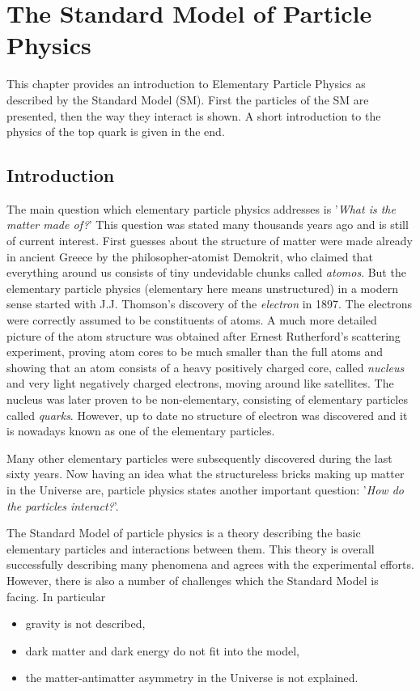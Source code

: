 \chapter{The Standard Model of Particle Physics}\label{chapt:SM}

This chapter provides an introduction to Elementary Particle Physics as described by the Standard Model (SM).
First the particles of the SM are presented, then the way they interact is shown. A short introduction
to the physics of the top quark is given in the end.

\section{Introduction}

The main question which elementary particle physics addresses is '\textit{What is the matter made of?}'
This question was stated many thousands years ago and is still of current interest. First guesses about
the structure of matter were made already in ancient Greece by the philosopher-atomist Demokrit, who
claimed that everything around us consists of tiny undevidable chunks called \textit{atomos}\cite{yangcn}.
But the elementary particle physics (elementary here means unstructured) in a modern sense started with 
J.J. Thomson's discovery of the \textit{electron}\cite{jjthome} in 1897. The electrons were correctly assumed to be constituents
of atoms. A much more detailed picture of the atom structure was obtained after Ernest Rutherford's scattering experiment\cite{rutherford},
proving atom cores to be much smaller than the full atoms and showing that an atom consists of a heavy positively charged core, called 
\textit{nucleus} and very light negatively charged electrons, moving around like satellites. 
The nucleus was later proven to be non-elementary, consisting of elementary particles called \textit{quarks}. 
However, up to date no structure of electron was discovered 
and it is nowadays known as one of the elementary particles. 

Many other elementary particles were subsequently discovered during the last sixty years. Now having an idea 
what the structureless bricks making up matter in the Universe are, particle physics
states another important question: '\textit{How do the particles interact?}'.

The Standard Model of particle physics is a theory describing the basic elementary particles
and interactions between them. This theory is overall successfully describing many phenomena and 
agrees with the experimental efforts. However, there is also a number of challenges which the Standard Model
is facing. In particular
\begin{itemize}
 \item gravity is not described,
 \item dark matter and dark energy do not fit into the model,
 \item the matter-antimatter asymmetry in the Universe is not explained.
\end{itemize}


